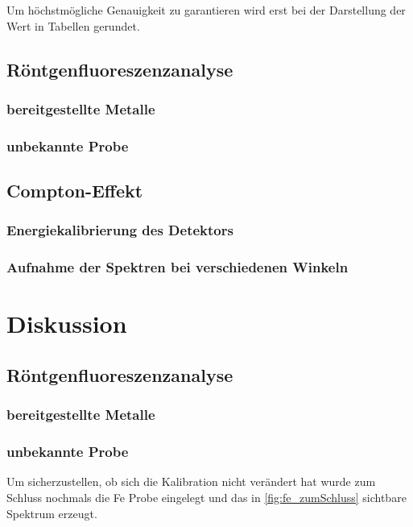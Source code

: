 \documentclass[12pt,english,ngerman]{scrartcl}
\begin{document}
Um höchstmögliche Genauigkeit zu garantieren wird erst bei der Darstellung der
Wert in Tabellen gerundet.

\subsection{Röntgenfluoreszenzanalyse}

\subsubsection{bereitgestellte Metalle}

\subsubsection{unbekannte Probe}

\subsection{Compton-Effekt}

\subsubsection{Energiekalibrierung des Detektors}

\subsubsection{Aufnahme der Spektren bei verschiedenen Winkeln}

\section{Diskussion}\label{sec:diskussion}

\subsection{Röntgenfluoreszenzanalyse}

\subsubsection{bereitgestellte Metalle}

\subsubsection{unbekannte Probe}

Um sicherzustellen, ob sich die Kalibration nicht verändert hat wurde zum
Schluss nochmals die Fe Probe eingelegt und das in \autoref{fig:fe_zumSchluss}
sichtbare Spektrum erzeugt.
\end{document}
